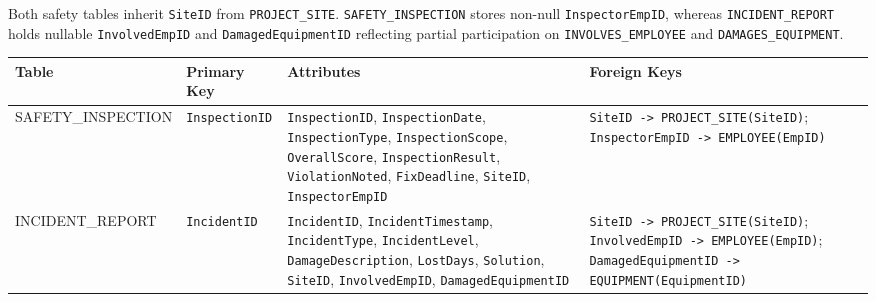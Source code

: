 \documentclass[a4paper,12pt]{report}
\newcounter{none} %
\begin{document}
Both safety tables inherit \texttt{SiteID} from \texttt{PROJECT\_\allowbreak{}SITE}. \texttt{SAFETY\_\allowbreak{}INSPECTION} stores non-null \texttt{InspectorEmpID}, whereas \texttt{INCIDENT\_\allowbreak{}REPORT} holds nullable \texttt{InvolvedEmpID} and \texttt{DamagedEquipmentID} reflecting partial participation on \texttt{INVOLVES\_\allowbreak{}EMPLOYEE} and \texttt{DAMAGES\_\allowbreak{}EQUIPMENT}.

{\def\LTcaptype{none} %
\begin{longtable}[]{@{}
  >{\raggedright\arraybackslash}p{}
  >{\raggedright\arraybackslash}p{}
  >{\raggedright\arraybackslash}p{}
  >{\raggedright\arraybackslash}p{}@{}}
\toprule\noalign{}
\begin{minipage}[b]{\linewidth}\raggedright
Table
\end{minipage} & \begin{minipage}[b]{\linewidth}\raggedright
Primary Key
\end{minipage} & \begin{minipage}[b]{\linewidth}\raggedright
Attributes
\end{minipage} & \begin{minipage}[b]{\linewidth}\raggedright
Foreign Keys
\end{minipage} \\
\midrule\noalign{}
\endhead
\bottomrule\noalign{}
\endlastfoot
SAFETY\_\allowbreak{}INSPECTION & \texttt{InspectionID} & \texttt{InspectionID}, \texttt{InspectionDate}, \texttt{InspectionType}, \texttt{InspectionScope}, \texttt{OverallScore}, \texttt{InspectionResult}, \texttt{ViolationNoted}, \texttt{FixDeadline}, \texttt{SiteID}, \texttt{InspectorEmpID} & \texttt{SiteID -\textgreater{} PROJECT\_\allowbreak{}SITE(\allowbreak{}\allowbreak{}SiteID)}; \texttt{InspectorEmpID -\textgreater{} EMPLOYEE(\allowbreak{}\allowbreak{}EmpID)} \\
INCIDENT\_\allowbreak{}REPORT & \texttt{IncidentID} & \texttt{IncidentID}, \texttt{IncidentTimestamp}, \texttt{IncidentType}, \texttt{IncidentLevel}, \texttt{DamageDescription}, \texttt{LostDays}, \texttt{Solution}, \texttt{SiteID}, \texttt{InvolvedEmpID}, \texttt{DamagedEquipmentID} & \texttt{SiteID -\textgreater{} PROJECT\_\allowbreak{}SITE(\allowbreak{}\allowbreak{}SiteID)}; \texttt{InvolvedEmpID -\textgreater{} EMPLOYEE(\allowbreak{}\allowbreak{}EmpID)}; \texttt{DamagedEquipmentID -\textgreater{} EQUIPMENT(\allowbreak{}\allowbreak{}EquipmentID)} \\
\end{longtable}
}
\end{document}
